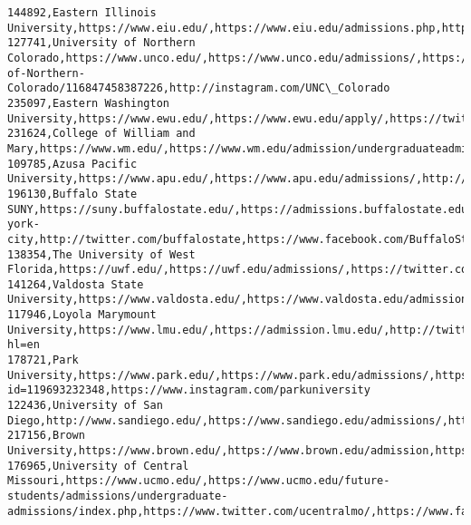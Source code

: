 \documentclass[11pt]{article}
\begin{document}
\begin{Verbatim}[commandchars=\\\{\}]
144892,Eastern Illinois University,https://www.eiu.edu/,https://www.eiu.edu/admissions.php,http://www.twitter.com/eiu,https://www.facebook.com/iameiu/posts/10154697624831857,https://www.instagram.com/p/BCEob7bP7XN/
127741,University of Northern Colorado,https://www.unco.edu/,https://www.unco.edu/admissions/,https://twitter.com/UNC\_Colorado,http://www.facebook.com/home.php\#!/pages/University-of-Northern-Colorado/116847458387226,http://instagram.com/UNC\_Colorado
235097,Eastern Washington University,https://www.ewu.edu/,https://www.ewu.edu/apply/,https://twitter.com/ewueagles,https://www.facebook.com/ewueagles/,http://instagram.com/easternwashingtonuniversity
231624,College of William and Mary,https://www.wm.edu/,https://www.wm.edu/admission/undergraduateadmission/index.php,https://twitter.com/williamandmary,https://www.facebook.com/williamandmary,https://instagram.com/william\_and\_mary
109785,Azusa Pacific University,https://www.apu.edu/,https://www.apu.edu/admissions/,http://twitter.com/azusapacific,https://www.facebook.com/azusapacific,https://www.instagram.com/azusapacific/
196130,Buffalo State SUNY,https://suny.buffalostate.edu/,https://admissions.buffalostate.edu/new-york-city,http://twitter.com/buffalostate,https://www.facebook.com/BuffaloStateCollege,http://instagram.com/buffalostate
138354,The University of West Florida,https://uwf.edu/,https://uwf.edu/admissions/,https://twitter.com/UWF,https://www.facebook.com/WestFL,https://instagram.com/uwf
141264,Valdosta State University,https://www.valdosta.edu/,https://www.valdosta.edu/admissions/undergraduate/,https://twitter.com/valdostastate,https://www.facebook.com/valdostastate/,https://www.instagram.com/valdostastate/
117946,Loyola Marymount University,https://www.lmu.edu/,https://admission.lmu.edu/,http://twitter.com/loyolamarymount,https://www.facebook.com/lmula,https://instagram.com/loyolamarymount/?hl=en
178721,Park University,https://www.park.edu/,https://www.park.edu/admissions/,https://twitter.com/parkuniversity,https://facebook.com/profile.php?id=119693232348,https://www.instagram.com/parkuniversity
122436,University of San Diego,http://www.sandiego.edu/,https://www.sandiego.edu/admissions/,http://twitter.com/uofsandiego,http://www.facebook.com/usandiego,http://instagram.com/uofsandiego
217156,Brown University,https://www.brown.edu/,https://www.brown.edu/admission,https://twitter.com/BrownUniversity,https://www.facebook.com/BrownUniversity,https://instagram.com/brownu/
176965,University of Central Missouri,https://www.ucmo.edu/,https://www.ucmo.edu/future-students/admissions/undergraduate-admissions/index.php,https://www.twitter.com/ucentralmo/,https://www.facebook.com/UCentralMO/,https://www.instagram.com/ucentralmo/

\end{Verbatim}
\end{document}
